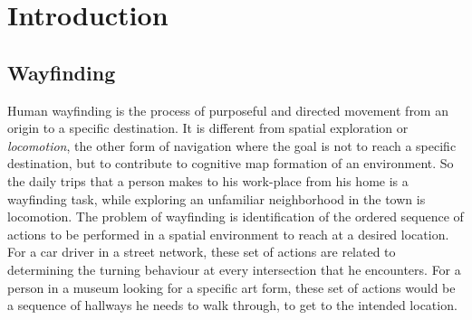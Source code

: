 \documentclass{iitkthesis}
\begin{document}
\author{Arbaz Khan}
\dissertation
\maketitle
\makecertificate
\begin{abstract}
\iffalse
  A computational model of understanding place descriptions is a cardinal issue in multiple disciplines and provides critical applications especially in dialog-driven geolocation services. This research targets the automated extraction of spatial triplets to represent qualitative spatial relations between recognized places from natural language place descriptions via a simple class of locative expressions. We attempt to produce triplets, informative and \textit{convenient} enough as a medium to convert verbal descriptions to graph representations of places and their relationships. We present a reasoning approach devoid of any external resources (such as maps, path geometries or robotic vision) for understanding place descriptions. We then apply our methodologies to situated place descriptions and study the results, its errors and implied future research.
\fi
\end{abstract}
\tableofcontents
\chapter{Introduction}
\section{Wayfinding}
Human wayfinding is the process of purposeful and directed movement from an origin to a specific destination. It is different from spatial exploration or \textit{locomotion}, the other form of navigation where the goal is not to reach a specific destination, but to contribute to cognitive map formation of an environment. So the daily trips that a person makes to his work-place from his home is a wayfinding task, while exploring an unfamiliar neighborhood in the town is locomotion. The problem of wayfinding is identification of the ordered sequence of actions to be performed in a spatial environment to reach at a desired location. For a car driver in a street network, these set of actions are related to determining the turning behaviour at every intersection that he encounters. For a person in a museum looking for a specific art form, these set of actions would be a sequence of hallways he needs to walk through, to get to the intended location. 
\end{document}

